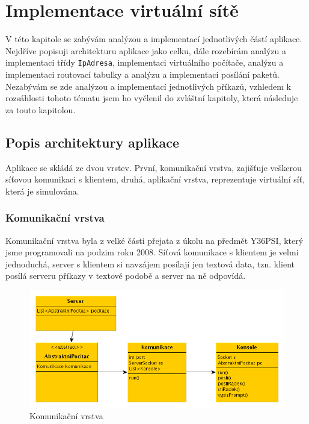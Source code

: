 
\chapter{Implementace virtuální sítě}

V této kapitole se zabývám analýzou a implementací jednotlivých částí aplikace. Nejdříve popisuji architekturu aplikace jako celku, dále rozebírám analýzu a implementaci třídy \verb|IpAdresa|, implementaci virtuálního počítače, analýzu a implementaci routovací tabulky a analýzu a implementaci posílání paketů. Nezabývám se zde analýzou a implementací jednotlivých příkazů, vzhledem k rozsáhlosti tohoto tématu jsem ho vyčlenil do zvláštní kapitoly, která následuje za touto kapitolou.




\section{Popis architektury aplikace}

Aplikace se skládá ze dvou vrstev. První, komunikační vrstva, zajišťuje veškerou síťovou komunikaci s klientem, druhá, aplikační vrstva, reprezentuje virtuální síť, která je simulována. 


\subsection{Komunikační vrstva}\label{impl_komunikacni_vrstva}

Komunikační vrstva byla z velké části přejata z úkolu na předmět Y36PSI, který jsme programovali na podzim roku 2008. Síťová komunikace s klientem je velmi jednoduchá, server s klientem si navzájem posílají jen textová data, tzn. klient posílá serveru příkazy v textové podobě a server na ně odpovídá.

\begin{figure}[h]
\begin{center}
\includegraphics[width=14cm]{obrazky/komunikacni_vrstva}
\caption{Komunikační vrstva}
\label{obr_komunikacni_vrstva}
\end{center}
\end{figure}


